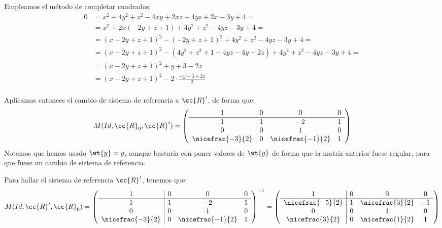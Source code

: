 \begin{ejercicio}
\begin{enumerate}
        Empleamos el método de completar cuadrados:
        \begin{equation*}
            \begin{split}
                0 &= x^2 + 4y^2 + z^2 - 4xy + 2xz - 4yz + 2x - 3y + 4 =\\
                &= x^2 + 2x(-2y+z+1)+ 4y^2 + z^2 - 4yz - 3y + 4 =\\
                &= (x-2y+z+1)^2-(-2y+z+1)^2+ 4y^2 + z^2 - 4yz - 3y + 4 =\\
                &= (x-2y+z+1)^2-(4y^2+z^2+1-4yz-4y+2z)+ 4y^2 + z^2 - 4yz - 3y + 4 =\\
                &= (x-2y+z+1)^2 +y + 3-2z\\
                &= (x-2y+z+1)^2 -2\cdot \frac{-y - 3+2z}{2}\\
            \end{split}
        \end{equation*}

        Aplicamos entonces el cambio de sistema de referencia a $\cc{R}'$, de forma que:
        \begin{equation*}
            M(Id, \cc{R}_0, \cc{R}') = \left(\begin{array}{c|ccc}
                1 & 0 & 0 & 0 \\ \hline
                1 & 1 & -2 & 1 \\
                0 & 0 & 1 & 0 \\
                \nicefrac{-3}{2} & 0 & \nicefrac{-1}{2} & 1
            \end{array}\right)
        \end{equation*}
        Notemos que hemos usado $\wt{y}=y$, aunque bastaría con poner valores de $\wt{y}$ de forma que la matriz anterior fuese regular, para que fuese un cambio de sistema de referencia.

        Para hallar el sistema de referencia $\cc{R}'$, tenemos que:
        \begin{equation*}
            M(Id, \cc{R}', \cc{R}_0) = \left(\begin{array}{c|ccc}
                1 & 0 & 0 & 0 \\ \hline
                1 & 1 & -2 & 1 \\
                0 & 0 & 1 & 0 \\
                \nicefrac{-3}{2} & 0 & \nicefrac{-1}{2} & 1
            \end{array}\right)^{-1}
            = \left(\begin{array}{c|ccc}
                1 & 0 & 0 & 0 \\ \hline
                \nicefrac{-5}{2} & 1 & \nicefrac{3}{2} & -1 \\
                0 & 0 & 1 & 0 \\
                \nicefrac{3}{2} & 0 & \nicefrac{1}{2} & 1
            \end{array}\right)
        \end{equation*}
        


\end{enumerate}
\end{ejercicio}
